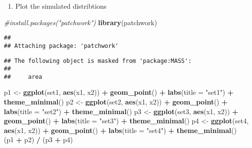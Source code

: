 \documentclass[
]{article}
\newenvironment{Shaded}{\begin{snugshade}}{\end{snugshade}}
\newcommand{\AttributeTok}[1]{\textcolor[rgb]{0.13,0.29,0.53}{#1}}
\newcommand{\CommentTok}[1]{\textcolor[rgb]{0.56,0.35,0.01}{\textit{#1}}}
\newcommand{\FunctionTok}[1]{\textcolor[rgb]{0.13,0.29,0.53}{\textbf{#1}}}
\newcommand{\NormalTok}[1]{#1}
\newcommand{\OtherTok}[1]{\textcolor[rgb]{0.56,0.35,0.01}{#1}}
\newcommand{\SpecialCharTok}[1]{\textcolor[rgb]{0.81,0.36,0.00}{\textbf{#1}}}
\newcommand{\StringTok}[1]{\textcolor[rgb]{0.31,0.60,0.02}{#1}}
\providecommand{\tightlist}{%
  \setlength{\itemsep}{0pt}\setlength{\parskip}{0pt}}
\begin{document}
\begin{enumerate}
\def\labelenumi{\alph{enumi})}
\setcounter{enumi}{1}
\tightlist
\item
  Plot the simulated distribtions
\end{enumerate}

\begin{Shaded}
\begin{Highlighting}[]
\CommentTok{\#install.packages("patchwork")}
\FunctionTok{library}\NormalTok{(patchwork)}
\end{Highlighting}
\end{Shaded}

\begin{verbatim}
## 
## Attaching package: 'patchwork'
\end{verbatim}

\begin{verbatim}
## The following object is masked from 'package:MASS':
## 
##     area
\end{verbatim}

\begin{Shaded}
\begin{Highlighting}[]
\NormalTok{p1 }\OtherTok{\textless{}{-}} \FunctionTok{ggplot}\NormalTok{(set1, }\FunctionTok{aes}\NormalTok{(x1, x2)) }\SpecialCharTok{+} \FunctionTok{geom\_point}\NormalTok{() }\SpecialCharTok{+} \FunctionTok{labs}\NormalTok{(}\AttributeTok{title =} \StringTok{"set1"}\NormalTok{) }\SpecialCharTok{+} \FunctionTok{theme\_minimal}\NormalTok{()}
\NormalTok{p2 }\OtherTok{\textless{}{-}} \FunctionTok{ggplot}\NormalTok{(set2, }\FunctionTok{aes}\NormalTok{(x1, x2)) }\SpecialCharTok{+} \FunctionTok{geom\_point}\NormalTok{() }\SpecialCharTok{+} \FunctionTok{labs}\NormalTok{(}\AttributeTok{title =} \StringTok{"set2"}\NormalTok{) }\SpecialCharTok{+} \FunctionTok{theme\_minimal}\NormalTok{()}
\NormalTok{p3 }\OtherTok{\textless{}{-}} \FunctionTok{ggplot}\NormalTok{(set3, }\FunctionTok{aes}\NormalTok{(x1, x2)) }\SpecialCharTok{+} \FunctionTok{geom\_point}\NormalTok{() }\SpecialCharTok{+} \FunctionTok{labs}\NormalTok{(}\AttributeTok{title =} \StringTok{"set3"}\NormalTok{) }\SpecialCharTok{+} \FunctionTok{theme\_minimal}\NormalTok{()}
\NormalTok{p4 }\OtherTok{\textless{}{-}} \FunctionTok{ggplot}\NormalTok{(set4, }\FunctionTok{aes}\NormalTok{(x1, x2)) }\SpecialCharTok{+} \FunctionTok{geom\_point}\NormalTok{() }\SpecialCharTok{+} \FunctionTok{labs}\NormalTok{(}\AttributeTok{title =} \StringTok{"set4"}\NormalTok{) }\SpecialCharTok{+} \FunctionTok{theme\_minimal}\NormalTok{()}
\NormalTok{(p1 }\SpecialCharTok{+}\NormalTok{ p2) }\SpecialCharTok{/}\NormalTok{ (p3 }\SpecialCharTok{+}\NormalTok{ p4)}
\end{Highlighting}
\end{Shaded}
\end{document}
